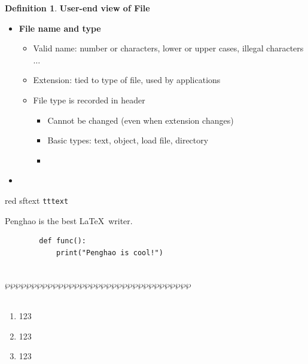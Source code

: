 \documentclass[11pt,a4paper]{article}
\theoremstyle{definition}
\newtheorem{definition}{Definition}[section]
\newenvironment{myitemize}
{ \begin{itemize}
    \setlength{\itemsep}{5pt}
    \setlength{\parskip}{0pt}
    \setlength{\parsep}{0pt}     }
{ \end{itemize}                  }
\begin{document}
\begin{definition}{\textbf{User-end view of File}}
	\begin{myitemize}
		\item \textbf{File name and type}
		\begin{myitemize}
			\item Valid name: number or characters, lower or upper cases, illegal characters $\dots$
			\item Extension: tied to type of file, used by applications
			\item File type is recorded in header
			\begin{myitemize}
				\item Cannot be changed (even when extension changes)
				\item Basic types: text, object, load file, directory
				\item  
			\end{myitemize}
		\end{myitemize}
	\end{myitemize}
\end{definition}


\newpage
\begin{myitemize}
	\item 
\end{myitemize}

{\color{red} red } \textsf{sftext} \texttt{tttext}
\begin{tcolorbox} 
Penghao is the best \LaTeX \, writer.
\end{tcolorbox}
\begin{tcolorbox}
	\begin{lstlisting}
		def func():
			print("Penghao is cool!")
	\end{lstlisting}
\end{tcolorbox}
\noindent{}\\\noindent$\wp\wp\wp\wp\wp\wp\wp\wp\wp\wp\wp\wp\wp\wp\wp\wp\wp\wp\wp\wp\wp\wp\wp\wp\wp\wp\wp\wp\wp\wp\wp\wp\wp\wp\wp$\\
{}\\
\lipsum[1]

\vspace{-\topsep}
\begin{enumerate}
	\item 123
	\item 123
	\item 123
\end{enumerate}
\vspace{-\topsep}
\end{document}
